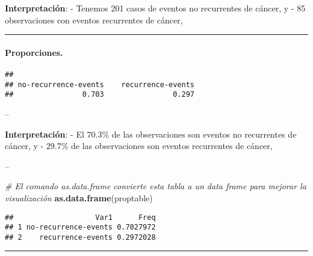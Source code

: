 \documentclass[
]{article}
\newenvironment{Shaded}{\begin{snugshade}}{\end{snugshade}}
\newcommand{\CommentTok}[1]{\textcolor[rgb]{0.56,0.35,0.01}{\textit{#1}}}
\newcommand{\DecValTok}[1]{\textcolor[rgb]{0.00,0.00,0.81}{#1}}
\newcommand{\KeywordTok}[1]{\textcolor[rgb]{0.13,0.29,0.53}{\textbf{#1}}}
\newcommand{\NormalTok}[1]{#1}
\newcommand{\OperatorTok}[1]{\textcolor[rgb]{0.81,0.36,0.00}{\textbf{#1}}}
\newcommand{\StringTok}[1]{\textcolor[rgb]{0.31,0.60,0.02}{#1}}
\let\oldparagraph\paragraph
\renewcommand{\paragraph}[1]{\oldparagraph{#1}\mbox{}}
\begin{document}
\textbf{Interpretación}: - Tenemos 201 casos de eventos no recurrentes
de cáncer, y - 85 observaciones con eventos recurrentes de cáncer,

\begin{center}\rule{0.5\linewidth}{0.5pt}\end{center}

\hypertarget{proporciones.}{%
\paragraph{Proporciones.}\label{proporciones.}}

\begin{Shaded}
\end{Shaded}

\begin{verbatim}
## 
## no-recurrence-events    recurrence-events 
##                0.703                0.297
\end{verbatim}

--

\textbf{Interpretación}: - El 70.3\% de las observaciones son eventos no
recurrentes de cáncer, y - 29.7\% de las observaciones son eventos
recurrentes de cáncer,

--

\begin{Shaded}
\begin{Highlighting}[]
\CommentTok{# El comando as.data.frame convierte esta tabla a un data frame para mejorar la visualización }
\KeywordTok{as.data.frame}\NormalTok{(proptable)  }
\end{Highlighting}
\end{Shaded}

\begin{verbatim}
##                   Var1      Freq
## 1 no-recurrence-events 0.7027972
## 2    recurrence-events 0.2972028
\end{verbatim}

\begin{center}\rule{0.5\linewidth}{0.5pt}\end{center}
\end{document}
